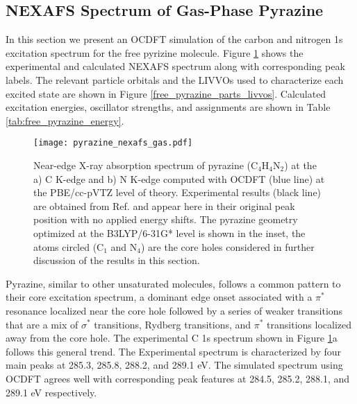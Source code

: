\documentclass{article}
\begin{document}

\subsection*{NEXAFS Spectrum of Gas-Phase Pyrazine}
In this section we present an OCDFT simulation of the carbon and nitrogen 1s excitation spectrum for the free pyrizine molecule. Figure \ref{fig:free_pyrazine_nexafs} shows the experimental and calculated NEXAFS spectrum along with corresponding peak labels. The relevant particle orbitals and the LIVVOs used to characterize each excited state are shown in Figure \ref{free_pyrazine_parts_livvos}. Calculated excitation energies, oscillator strengths, and assignments are shown in Table \ref{tab:free_pyrazine_energy}. 

\begin{figure}[t!]
\centering
\texttt{[image: pyrazine\_nexafs\_gas.pdf]}
\caption{Near-edge X-ray absorption spectrum of pyrazine (C$_4$H$_4$N$_2$) at the a) C K-edge and b) N K-edge computed with OCDFT (blue line) at the PBE/cc-pVTZ level of theory. Experimental results (black line) are obtained from Ref.  and appear here in their original peak position with no applied energy shifts. The pyrazine geometry optimized at the B3LYP/6-31G* level is shown in the inset, the atoms circled (C$_1$ and N$_4$) are the core holes considered in further discussion of the results in this section.}
\label{fig:free_pyrazine_nexafs}
\end{figure}

Pyrazine, similar to other unsaturated molecules, follows a common pattern to their core excitation spectrum, a dominant edge onset associated with a $\pi^*$ resonance localized near the core hole followed by a series of weaker transitions that are a mix of $\sigma^*$ transitions, Rydberg transitions, and $\pi^*$ transitions localized away from the core hole. The experimental C 1s spectrum shown in Figure \ref{fig:free_pyrazine_nexafs}a follows this general trend. The Experimental spectrum is characterized by four main peaks at 285.3, 285.8, 288.2, and 289.1 eV. The simulated spectrum using OCDFT agrees well with corresponding peak features at 284.5, 285.2, 288.1, and 289.1 eV respectively. 
\end{document}
